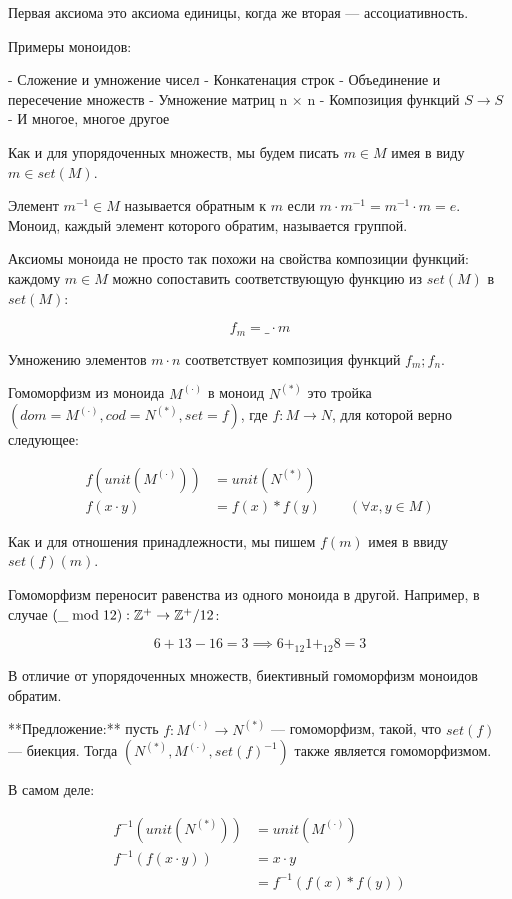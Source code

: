 \documentclass[10pt, a4paper]{article}
\theoremstyle{colon}
\begin{document}
Первая аксиома это аксиома единицы, когда же вторая — ассоциативность.

Примеры моноидов:

- Сложение и умножение чисел
- Конкатенация строк
- Объединение и пересечение множеств
- Умножение матриц n × n
- Композиция функций \( S \to S \)
- И многое, многое другое

Как и для упорядоченных множеств, мы будем писать \( m \in M \) имея в виду \( m \in set(M) \).

Элемент \( m^{-1} \in M \) называется обратным к \( m \) если \( m \cdot m^{-1} = m^{-1} \cdot m = e \).
Моноид, каждый элемент которого обратим, называется группой.

Аксиомы моноида не просто так похожи на свойства композиции функций: каждому \( m \in M \)
можно сопоставить соответствующую функцию из \( set(M) \) в \( set(M) \):

\[
f_m = \_ \cdot m
\]

Умножению элементов \( m \cdot n \) соответствует композиция функций \( f_m \mathbin{\bm;} f_n \).

Гомоморфизм из моноида \( M^{(\cdot)} \) в моноид \( N^{(*)} \) это
тройка \( (dom = M^{(\cdot)}, cod = N^{(*)}, set = f) \), где \( f : M \to N \), для которой верно следующее:

\begin{align*}
f(unit(M^{(\cdot)})) &= unit(N^{(*)}) \\
f(x \cdot y) &= f(x) * f(y) \qquad (\forall x, y \in M)
\end{align*}

Как и для отношения принадлежности, мы пишем \( f(m) \) имея в ввиду \( set(f)(m) \).

Гомоморфизм переносит равенства из одного моноида в другой.
Например, в случае \( (\_ \bmod 12) : \Bbb Z^{+} \to \Bbb Z^{+}/12 \):

\[
6 + 13 - 16 = 3 \implies 6 +_{12} 1 +_{12} 8 = 3
\]

В отличие от упорядоченных множеств, биективный гомоморфизм моноидов обратим.

**Предложение:** пусть \( f : M^{(\cdot)} \to N^{(*)} \) — гомоморфизм, такой, что \( set(f) \) — биекция.
Тогда \( (N^{(*)}, M^{(\cdot)}, set(f)^{-1}) \) также является гомоморфизмом.

В самом деле:

\begin{align*}
f^{-1}(unit(N^{(*)})) &= unit(M^{(\cdot)}) \\
f^{-1}(f(x \cdot y)) &= x \cdot y \\
&= f^{-1}(f(x) * f(y))
\end{align*}
\end{document}
